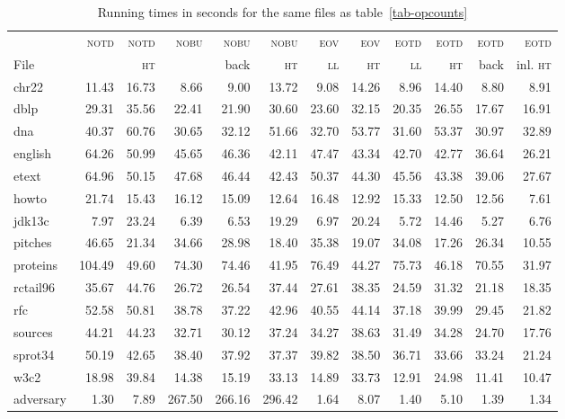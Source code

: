 \documentclass{llncs}
\newcommand\notd{\textsc{notd}\xspace}
\newcommand\nobu{\textsc{nobu}\xspace}
\newcommand\eotd{\textsc{eotd}\xspace}
\newcommand\eov{\textsc{eov}\xspace}
\newcommand\lili{\textsc{ll}\xspace}
\newcommand\hata{\textsc{ht}\xspace}
\begin{document}
\begin{table}[t]
\begin{center}
    \scriptsize
     \addtolength{\tabcolsep}{.3ex}
    \begin{tabular}{lrrrrrrrrrrr}
		&             \notd	&	\notd&	\nobu&	\nobu&	\nobu&
                \eov  &	\eov &	\eotd&	\eotd &	\eotd&	\eotd\\
	File&	     &	\hata&	             &    back & \hata  &	\lili &	        \hata &	\lili&	         \hata&	 back&	     inl. \hata \\ \hline
	chr22&	11.43&	16.73&	8.66& 9.00 &	13.72&	9.08&	14.26&	8.96&	14.40&	8.80&	8.91 \\
	dblp&	29.31&	35.56&	22.41& 21.90 &	30.60&	23.60&	32.15&	20.35&	26.55&	17.67&	16.91 \\
	dna&	40.37&	60.76&	30.65& 32.12 &	51.66&	32.70&	53.77&	31.60&	53.37&	30.97&	32.89 \\
	english&	64.26&	50.99&	45.65& 46.36 &	42.11&	47.47&	43.34&	42.70&	42.77&	36.64&	26.21 \\
	etext&	64.96&	50.15&	47.68& 46.44 &	42.43&	50.37&	44.30&	45.56&	43.38&	39.06&	27.67 \\
	howto&	21.74&	15.43&	16.12& 15.09 &	12.64&	16.48&	12.92&	15.33&	12.50&	12.56&	7.61 \\
	jdk13c&	7.97&	23.24&	6.39& 6.53 &	19.29&	6.97&	20.24&	5.72&	14.46&	5.27&	6.76 \\
	pitches&	46.65&	21.34&	34.66& 28.98 &	18.40&	35.38&	19.07&	34.08&	17.26&	26.34&	10.55 \\
	proteins&	104.49&	49.60&	74.30& 74.46 &	41.95&	76.49&	44.27&	75.73&	46.18&	70.55&	31.97 \\
	rctail96&	35.67&	44.76&	26.72& 26.54 &	37.44&	27.61&	38.35&	24.59&	31.32&	21.18&	18.35 \\
	rfc&	52.58&	50.81&	38.78& 37.22 &	42.96&	40.55&	44.14&	37.18&	39.99&	29.45&	21.82 \\
	sources&	44.21&	44.23&	32.71& 30.12 &	37.24&	34.27&	38.63&	31.49&	34.28&	24.70&	17.76 \\
	sprot34&	50.19&	42.65&	38.40& 37.92 &	37.37&	39.82&	38.50&	36.71&	33.66&	33.24&	21.24 \\
	w3c2&	18.98&	39.84&	14.38& 15.19 &	33.13&	14.89&	33.73&	12.91&	24.98&	11.41&	10.47 \\
	adversary&	1.30&	7.89&	267.50&	266.16&	296.42&	1.64&	8.07&	1.40&	5.10&	1.39&	1.34 \\
    \end{tabular}
    \end{center}
    \caption{\label{tab-runtimes}Running times in seconds for the same files as
    table~\ref{tab-opcounts}}
      \vspace{-2mm}
\end{table}
\end{document}
